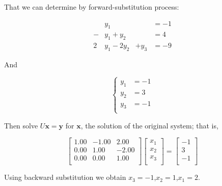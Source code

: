 \begin{solution}
That we can determine by forward-substitution process:

$$
\begin{aligned}
	 &y_1 &&= -1 \\
	 -&y_1+y_2& & =4 \\
	 2&y_1-2y_2&+y_3 &=-9
\end{aligned}
$$

And

\begin{equation*}
	\left\{
\begin{aligned}
y_1 &= -1\\
y_2 &= 3\\
y_3 &= -1\\
\end{aligned}
\right.
\end{equation*}


Then solve $U \mathbf{x}=\mathbf{y}$ for $\mathbf{x}$, the solution of the original system; that is,


$$
\begin{bmatrix} 
    1.00 &    -1.00 &     2.00  \\ 
    0.00 &     1.00 &    -2.00  \\ 
    0.00 &     0.00 &     1.00  \\ 
\end{bmatrix} 
\begin{bmatrix} 
    x_1  \\ 
    x_2  \\ 
    x_3  \\ 
\end{bmatrix}=
\begin{bmatrix} 
    -1  \\ 
    3  \\ 
    -1  \\ 
\end{bmatrix}
$$



 
Using backward substitution we obtain $x_3=-1$,$x_2=1$,$x_1=2$.

\end{solution}
